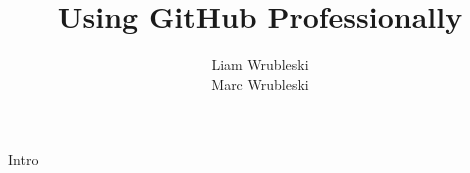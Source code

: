 \documentclass{beamer}
\title{Using GitHub Professionally}
\author{Liam Wrubleski\\Marc Wrubleski}
\begin{document}
\begin{frame}[plain]
    \maketitle
\end{frame}
\begin{frame}{Intro}
\end{frame}
\end{document}
